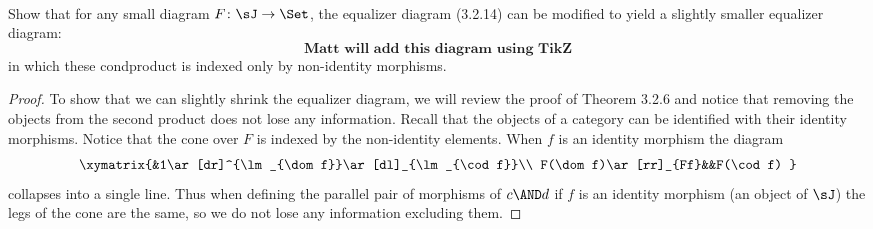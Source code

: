 \documentclass[main.tex]{subfiles}
\begin{document}
\paragraph{}
\begin{exercise}
	 Show that for any small diagram $ F\colon \sJ \to \Set $, the equalizer 
	 diagram (3.2.14) can be modified to yield a slightly smaller equalizer 
	 diagram:
	$$ \textbf{Matt will add this diagram using TikZ}$$
	in which these condproduct is indexed only by non-identity morphisms. 
\end{exercise}

\begin{proof}
	To show that we can slightly shrink the equalizer diagram, we will review
	the proof of Theorem 3.2.6 and notice that removing the objects from the 
	second product does not lose any information. Recall that the objects of 
	a category can be identified with their identity morphisms. Notice that
	the cone over $ F $ is indexed by the non-identity elements. When $ f $
	is an identity morphism the diagram
	$$
	\xymatrix{&1\ar[dr]^{\lm_{\dom f}}\ar[dl]_{\lm_{\cod f}}\\
		F(\dom f)\ar[rr]_{Ff}&&F(\cod f)
	}
	$$
	collapses into a single line. Thus when defining the parallel pair of 
	morphisms of $ c\AND d $ if $ f $ is an identity morphism (an object of $ 
	\sJ $) the legs of the cone are the same, so we do not lose any information excluding them.   
\end{proof}
\end{document}
